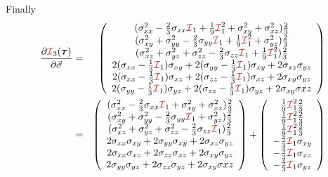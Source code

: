 Finally
\begin{eqnarray}
\frac{\partial {\III}_3(\bm\tau)}{\partial \vec\sigma}  
&=& \left(
\begin{array}{c}
(\sigma_{xx}^2 -\frac23 \sigma_{xx} {\III}_1 + \frac19{\III}_1^2 +  \sigma_{xy}^2 +  \sigma_{xz}^2 ) \frac23 \\
(\sigma_{xy}^2 +  \sigma_{yy}^2 -\frac23 \sigma_{yy} {\III}_1 + \frac19{\III}_1^2 +  \sigma_{yz}^2 ) \frac23 \\
(\sigma_{xz}^2 +  \sigma_{yz}^2 + \sigma_{zz}^2 -\frac23 \sigma_{zz} {\III}_1 + \frac19{\III}_1^2 ) \frac23 \\
2(\sigma_{xx}-\frac13{\III}_1)\sigma_{xy} +2 (\sigma_{yy}-\frac13{\III}_1)\sigma_{xy} + 2 \sigma_{xz}\sigma_{yz} \\
2(\sigma_{xx}-\frac13{\III}_1)\sigma_{xz} +2 (\sigma_{zz}-\frac13{\III}_1)\sigma_{xz} + 2 \sigma_{xy}\sigma_{yz} \\
2(\sigma_{yy}-\frac13{\III}_1)\sigma_{yz} +2 (\sigma_{zz}-\frac13{\III}_1)\sigma_{yz} + 2 \sigma_{xy}\sigma{xz} 
\end{array}
\right) \\
&=& \left(
\begin{array}{c}
(\sigma_{xx}^2 -\frac23 \sigma_{xx} {\III}_1  +  \sigma_{xy}^2 +  \sigma_{xz}^2 ) \frac23 \\
(\sigma_{xy}^2 +  \sigma_{yy}^2 -\frac23 \sigma_{yy} {\III}_1  +  \sigma_{yz}^2 ) \frac23 \\
(\sigma_{xz}^2 +  \sigma_{yz}^2 + \sigma_{zz}^2 -\frac23 \sigma_{zz} {\III}_1  ) \frac23 \\
2\sigma_{xx}\sigma_{xy} +2 \sigma_{yy}\sigma_{xy} + 2 \sigma_{xz}\sigma_{yz} \\
2\sigma_{xx}\sigma_{xz} +2 \sigma_{zz}\sigma_{xz} + 2 \sigma_{xy}\sigma_{yz} \\
2\sigma_{yy}\sigma_{yz} +2 \sigma_{zz}\sigma_{yz} + 2 \sigma_{xy}\sigma{xz} 
\end{array}
\right) 
+
\left(
\begin{array}{c}
\frac19{\III}_1^2 \frac23\\
\frac19{\III}_1^2 \frac23\\
\frac19{\III}_1^2 \frac23\\
-\frac43{\III}_1 \sigma_{xy} \\
-\frac43{\III}_1 \sigma_{xz} \\
-\frac43{\III}_1 \sigma_{yz} \\
\end{array}
\right) \nonumber\\

\end{eqnarray}
